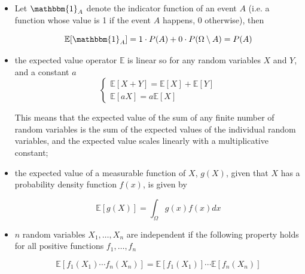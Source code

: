 \begin{itemize}
\tightlist
\item Let $\mathbbm{1}_{A}$ denote the indicator function of an event $A$ (i.e. a function whose value is 1 if the event $A$ happens, 0 otherwise), then

\begin{equation}
\mathbb{E}[\mathbbm{1}_{A}] = 1\cdot P(A)+0\cdot P(\Omega \setminus A)= P(A)
\end{equation}

\item the expected value operator \(\mathbb{E}\) is linear so for any random variables $X$ and $Y$, and a constant $a$
\begin{equation}
\begin{cases}
\mathbb{E}[X+Y] = \mathbb{E}[X] + \mathbb{E}[Y] \\
\mathbb{E}[aX] = a\mathbb{E}[X]
\end{cases}
\end{equation}

This means that the expected value of the sum of any finite number of random variables is the sum of the expected values of the individual random variables, and the expected value scales linearly with a multiplicative constant;

\item the expected value of a measurable function of $X$, $g(X)$, given that $X$ has a probability density function $f(x)$, is given by 

\begin{equation}
\mathbb{E}[g(X)] = \int_{\Omega}g(x)f(x) dx
\end{equation}


\item $n$ random variables $X_1 ,\ldots , X_n$ are independent if the following property holds for all positive functions $f_1 ,\ldots , f_n$

\begin{equation}
\mathbb{E}[f_1 (X_1 )\cdots f_n (X_n )] = \mathbb{E}[f_1 ( X_1 )] \cdots \mathbb{E}[f_n (X_n )]
\end{equation}
\end{itemize}


%


